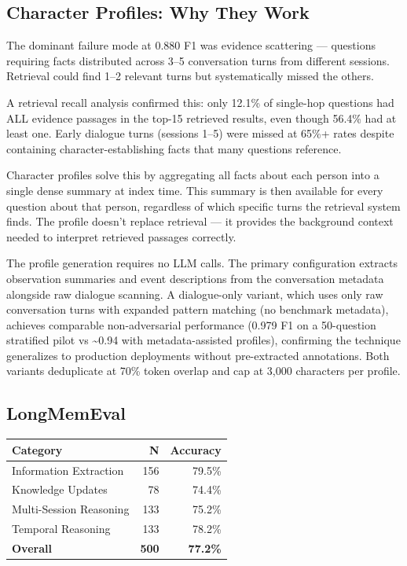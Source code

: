 \documentclass[11pt]{article}
\begin{document}
\subsection{Character Profiles: Why They Work}

The dominant failure mode at 0.880 F1 was evidence scattering --- questions requiring facts distributed across 3--5 conversation turns from different sessions. Retrieval could find 1--2 relevant turns but systematically missed the others.

A retrieval recall analysis confirmed this: only 12.1\% of single-hop questions had ALL evidence passages in the top-15 retrieved results, even though 56.4\% had at least one. Early dialogue turns (sessions 1--5) were missed at 65\%+ rates despite containing character-establishing facts that many questions reference.

Character profiles solve this by aggregating all facts about each person into a single dense summary at index time. This summary is then available for every question about that person, regardless of which specific turns the retrieval system finds. The profile doesn't replace retrieval --- it provides the background context needed to interpret retrieved passages correctly.

The profile generation requires no LLM calls. The primary configuration extracts observation summaries and event descriptions from the conversation metadata alongside raw dialogue scanning. A dialogue-only variant, which uses only raw conversation turns with expanded pattern matching (no benchmark metadata), achieves comparable non-adversarial performance (0.979 F1 on a 50-question stratified pilot vs \textasciitilde 0.94 with metadata-assisted profiles), confirming the technique generalizes to production deployments without pre-extracted annotations. Both variants deduplicate at 70\% token overlap and cap at 3,000 characters per profile.


\subsection{LongMemEval}


\begin{table}[htbp]
\centering
\small
\begin{tabular}{lrr}
\toprule
\textbf{Category} & \textbf{N} & \textbf{Accuracy} \\
\midrule
Information Extraction & 156 & 79.5\% \\
Knowledge Updates & 78 & 74.4\% \\
Multi-Session Reasoning & 133 & 75.2\% \\
Temporal Reasoning & 133 & 78.2\% \\
\textbf{Overall} & \textbf{500} & \textbf{77.2\%} \\
\bottomrule
\end{tabular}
\end{table}
\end{document}

